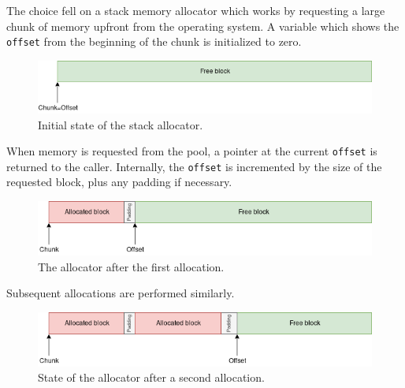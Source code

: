 \documentclass[12pt]{article}
\newcommand{\code}[1]{\texttt{#1}}
\begin{document}
\vspace{1pc}

The choice fell on a stack memory allocator which works by requesting a large chunk of memory upfront from the operating system. A variable which shows the \code{offset} from the beginning of the chunk is initialized to zero.

\begin{figure}[H]
	\begin{center}
		\includegraphics[width=\textwidth]{velout_stack_allocator_initial}
	\end{center}
	\caption{Initial state of the stack allocator.}
	\label{fig_velout_stack_allocator_initial}
\end{figure}

When memory is requested from the pool, a pointer at the current \code{offset} is returned to the caller. Internally, the \code{offset} is incremented by the size of the requested block, plus any padding if necessary.

\begin{figure}[H]
	\begin{center}
		\includegraphics[width=\textwidth]{velout_stack_allocator_alloc1}
	\end{center}
	\caption{The allocator after the first allocation.}
	\label{fig_velout_stack_allocator_alloc1}
\end{figure}

Subsequent allocations are performed similarly.

\begin{figure}[H]
	\begin{center}
		\includegraphics[width=\textwidth]{velout_stack_allocator_alloc2}
	\end{center}
	\caption{State of the allocator after a second allocation.}
	\label{fig_velout_stack_allocator_alloc2}
\end{figure}
\end{document}
